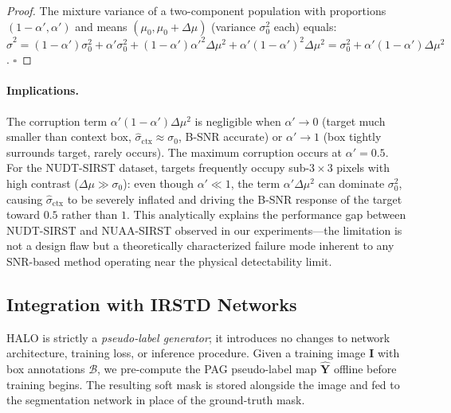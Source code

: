 \begin{proof}
The mixture variance of a two-component population with proportions $(1-\alpha', \alpha')$
and means $(\mu_0, \mu_0 + \Delta\mu)$ (variance $\sigma_0^2$ each) equals:
$\hat{\sigma}^2 = (1-\alpha')\sigma_0^2 + \alpha'\sigma_0^2
+ (1-\alpha')\alpha'^2\Delta\mu^2 + \alpha'(1-\alpha')^2\Delta\mu^2
= \sigma_0^2 + \alpha'(1-\alpha')\Delta\mu^2$.
\hfill$\square$
\end{proof}

\paragraph{Implications.}
The corruption term $\alpha'(1-\alpha')\Delta\mu^2$ is negligible when $\alpha' \to 0$
(target much smaller than context box, $\hat{\sigma}_\mathrm{ctx} \approx \sigma_0$,
B-SNR accurate) or $\alpha' \to 1$ (box tightly surrounds target, rarely occurs).
The maximum corruption occurs at $\alpha' = 0.5$.
For the NUDT-SIRST dataset, targets frequently occupy sub-$3\times3$ pixels with
high contrast ($\Delta\mu \gg \sigma_0$): even though $\alpha' \ll 1$, the term
$\alpha'\Delta\mu^2$ can dominate $\sigma_0^2$, causing $\hat{\sigma}_\mathrm{ctx}$
to be severely inflated and driving the B-SNR response of the target toward $0.5$
rather than $1$.
This analytically explains the performance gap between NUDT-SIRST and NUAA-SIRST
observed in our experiments---the limitation is not a design flaw but a theoretically
characterized failure mode inherent to any SNR-based method operating near the
physical detectability limit.

\subsection{Integration with IRSTD Networks}
\label{sec:method_train}

HALO is strictly a \emph{pseudo-label generator}; it introduces no changes to network
architecture, training loss, or inference procedure.
Given a training image $\mathbf{I}$ with box annotations $\mathcal{B}$, we pre-compute
the PAG pseudo-label map $\hat{\mathbf{Y}}$ offline before training begins.
The resulting soft mask is stored alongside the image and fed to the segmentation network
in place of the ground-truth mask.

